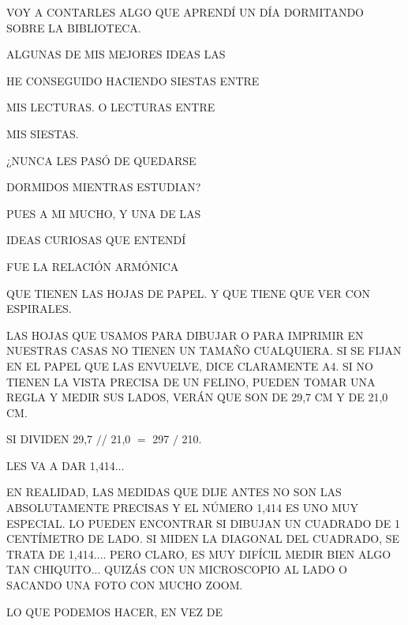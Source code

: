 \newpage
{}

VOY A CONTARLES ALGO QUE APRENDÍ UN DÍA DORMITANDO SOBRE LA BIBLIOTECA. 

ALGUNAS DE MIS MEJORES IDEAS LAS 

HE CONSEGUIDO HACIENDO SIESTAS ENTRE 

MIS LECTURAS. O LECTURAS ENTRE 

MIS SIESTAS.

¿NUNCA LES PASÓ DE QUEDARSE

DORMIDOS MIENTRAS ESTUDIAN?

PUES A MI MUCHO, Y UNA
DE LAS

IDEAS CURIOSAS QUE ENTENDÍ

FUE LA RELACIÓN ARMÓNICA 

QUE TIENEN LAS HOJAS DE PAPEL. Y QUE TIENE QUE VER CON ESPIRALES. 

\newpage
{}

LAS HOJAS QUE USAMOS PARA DIBUJAR O PARA IMPRIMIR EN NUESTRAS CASAS NO TIENEN UN TAMAÑO CUALQUIERA. SI SE FIJAN EN EL PAPEL QUE LAS ENVUELVE, DICE CLARAMENTE A4. SI NO TIENEN LA VISTA PRECISA DE UN FELINO, PUEDEN TOMAR UNA REGLA Y MEDIR SUS LADOS, VERÁN QUE SON DE 29,7 CM Y DE 21,0 CM.

SI DIVIDEN 29,7 $/$/ 21,0 $=$ 297 $/$ 210.

LES VA A DAR 1,414$\ldots$

EN REALIDAD, LAS MEDIDAS QUE DIJE ANTES NO SON LAS ABSOLUTAMENTE PRECISAS Y EL NÚMERO 1,414 ES UNO MUY ESPECIAL. LO PUEDEN ENCONTRAR SI DIBUJAN UN CUADRADO DE 1 CENTÍMETRO DE LADO. SI MIDEN LA DIAGONAL DEL CUADRADO, SE TRATA DE 1,414$\ldots$. PERO CLARO, ES MUY DIFÍCIL MEDIR BIEN ALGO TAN CHIQUITO... QUIZÁS CON UN MICROSCOPIO AL LADO O SACANDO UNA FOTO CON MUCHO ZOOM.


\newpage
{}
LO QUE PODEMOS HACER, EN VEZ DE 

